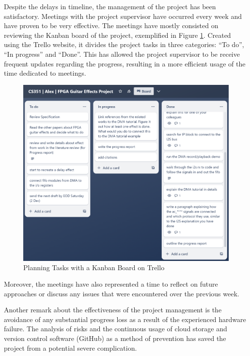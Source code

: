 Despite the delays in timeline, the management of the project has been satisfactory. Meetings with the project supervisor have occurred every week and have proven to be very effective. The meetings have mostly consisted on reviewing the Kanban board of the project, exemplified in Figure \ref{fig:trello-kanban}. Created using the Trello\cite{trello} website, it divides the project tasks in three categories: ``To do'', ``In progress'' and ``Done''. This has allowed the project supervisor to be receive frequent updates regarding the progress, resulting in a more efficient usage of the time dedicated to meetings.

\begin{figure}[h]
    \centering
    \includegraphics[width=0.9\linewidth]{progress-report/kanban.png}
    \caption{Planning Tasks with a Kanban Board on Trello}
    \label{fig:trello-kanban}
\end{figure}

Moreover, the meetings have also represented a time to reflect on future approaches or discuss any issues that were encountered over the previous week. 

Another remark about the effectiveness of the project management is the avoidance of any substantial progress loss as a result of the experienced hardware failure. The analysis of risks and the continuous usage of cloud storage and version control software (GitHub\cite{github}) as a method of prevention has saved the project from a potential severe complication.